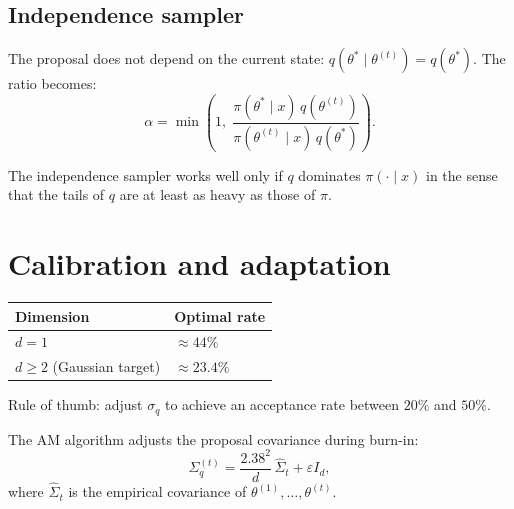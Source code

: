 \subsection{Independence sampler}

\begin{definition}
The proposal does not depend on the current state:
$q(\theta^* \mid \theta^{(t)}) = q(\theta^*)$. The ratio becomes:
\[
  \alpha = \min\!\left(1,\;
  \frac{\pi(\theta^* \mid x)\,q(\theta^{(t)})}
       {\pi(\theta^{(t)} \mid x)\,q(\theta^*)}\right).
\]
\end{definition}

\begin{warning}[title=\textbf{Domination condition}]
The independence sampler works well only if $q$ dominates
$\pi(\cdot \mid x)$ in the sense that the tails of $q$ are at least as
heavy as those of $\pi$.
\end{warning}

\section{Calibration and adaptation}

\begin{keyformulas}[title=\textbf{Optimal acceptance rate}]
\begin{center}
\renewcommand{\arraystretch}{1.3}
\begin{tabular}{ll}
\toprule
\textbf{Dimension} & \textbf{Optimal rate} \\
\midrule
$d = 1$ & $\approx 44\%$ \\
$d \geq 2$ (Gaussian target) & $\approx 23.4\%$ \\
\bottomrule
\end{tabular}
\end{center}
Rule of thumb: adjust $\sigma_q$ to achieve an acceptance rate between
$20\%$ and $50\%$.
\end{keyformulas}

\begin{definition}
The AM algorithm adjusts the proposal covariance during burn-in:
\[
  \Sigma_q^{(t)} = \frac{2.38^2}{d}\,\hat{\Sigma}_t + \varepsilon I_d,
\]
where $\hat{\Sigma}_t$ is the empirical covariance of
$\theta^{(1)}, \ldots, \theta^{(t)}$.
\end{definition}

